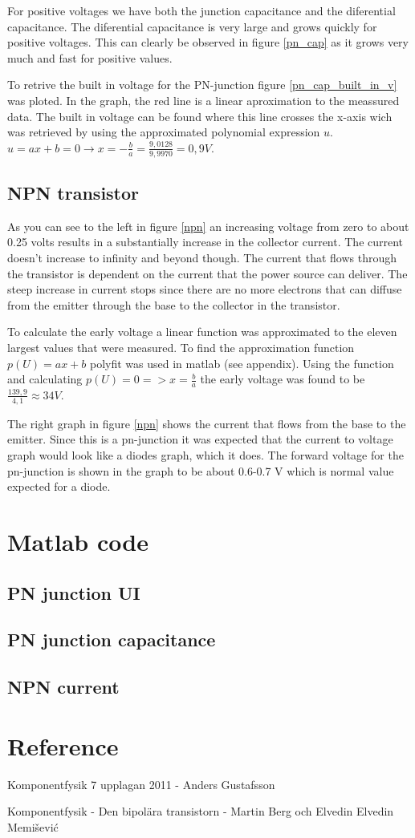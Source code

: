 \documentclass[a4paper]{article}
\begin{document}
For positive voltages we have both the junction capacitance and the diferential capacitance. The diferential capacitance is very large and grows quickly for positive voltages. This can clearly be observed in figure \ref{pn_cap} as it grows very much and fast for positive values.

To retrive the built in voltage for the PN-junction figure \ref{pn_cap_built_in_v} was ploted. In the graph, the red line is a linear aproximation to the meassured data. The built in voltage can be found where this line crosses the x-axis wich was retrieved by using the approximated polynomial expression $u$. $ u = ax + b = 0 \rightarrow x = -\frac{b}{a} = \frac{9,0128}{9,9970} = 0,9V$.

\subsection{NPN transistor}
As you can see to the left in figure \ref{npn} an increasing voltage from zero to about 0.25 volts results in a substantially increase in the collector current. The current doesn't increase to infinity and beyond though. The current that flows through the transistor is dependent on the current that the power source can deliver. The steep increase in current stops since there are no more electrons that can diffuse from the emitter through the base to the collector in the transistor.

To calculate the early voltage a linear function was approximated to the eleven largest values that were measured. To find the approximation function $p(U) = ax + b$ polyfit was used in matlab (see appendix). Using the function and calculating $p(U) = 0 => x = \frac{b}{a}$ the early voltage was found to be $\frac{139,9}{4,1} \approx 34V$.

The right graph in figure \ref{npn} shows the current that flows from the base to the emitter. Since this is a pn-junction it was expected that the current to voltage graph would look like a diodes graph, which it does. The forward voltage for the pn-junction is shown in the graph to be about 0.6-0.7 V which is normal value expected for a diode.

\newpage
\appendix
\section{Matlab code}
\subsection{PN junction UI}

\subsection{PN junction capacitance}

\subsection{NPN current}


\newpage
\section{Reference}
Komponentfysik  7 upplagan 2011 - Anders Gustafsson

Komponentfysik - Den bipolära transistorn - Martin Berg och Elvedin Elvedin Memišević
\end{document}
